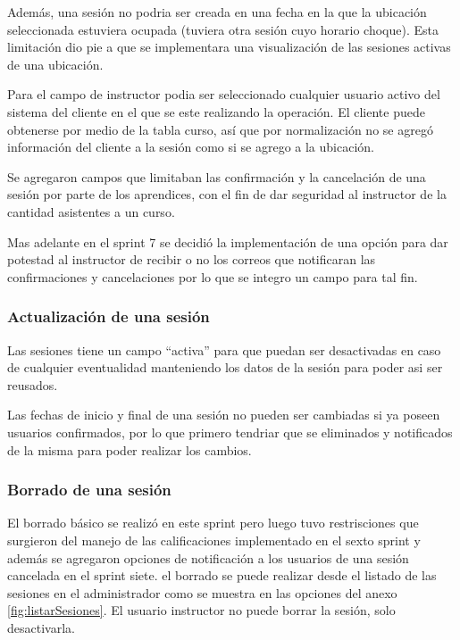 Además, una sesión no podria ser creada en una fecha en la que la ubicación seleccionada estuviera ocupada (tuviera otra sesión cuyo horario choque). Esta limitación dio pie a que se implementara una visualización de las sesiones activas de una ubicación.

Para el campo de instructor podia ser seleccionado cualquier usuario activo del sistema del cliente en el que se este realizando la operación. El cliente puede obtenerse por medio de la tabla curso, así que por normalización no se agregó información del cliente a la sesión como si se agrego a la ubicación.

Se agregaron campos que limitaban las confirmación y la cancelación de una sesión por parte de los aprendices, con el fin de dar seguridad al instructor de la cantidad asistentes a un curso.

Mas adelante en el sprint 7 se decidió la implementación de una opción para dar potestad al instructor de recibir o no los correos que notificaran las confirmaciones y cancelaciones por lo que se integro un campo para tal fin.

\subsubsection{Actualización de una sesión}

Las sesiones tiene un campo ``activa'' para que puedan ser desactivadas en caso de cualquier eventualidad manteniendo los datos de la sesión para poder asi ser reusados.

Las fechas de inicio y final de una sesión no pueden ser cambiadas si ya poseen usuarios confirmados, por lo que primero tendriar que se eliminados y notificados de la misma para poder realizar los cambios.

\subsubsection{Borrado de una sesión}

El borrado básico se realizó en este sprint pero luego tuvo restrisciones que surgieron del manejo de las calificaciones implementado en el sexto sprint y además se agregaron opciones de notificación a los usuarios de una sesión cancelada en el sprint siete. el borrado se puede realizar desde el listado de las sesiones en el administrador como se muestra en las opciones del anexo \ref{fig:listarSesiones}. El usuario instructor no puede borrar la sesión, solo desactivarla.


